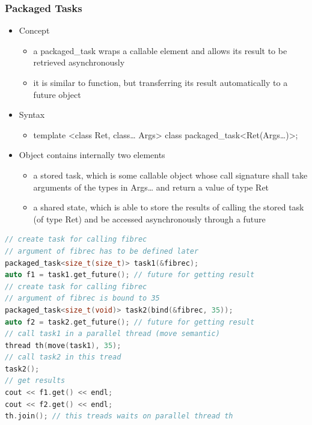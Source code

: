 \hypertarget{packaged-tasks}{%
\subsubsection{Packaged Tasks}\label{packaged-tasks}}

\begin{itemize}
\tightlist
\item
  Concept

  \begin{itemize}
  \tightlist
  \item
    a packaged\_task wraps a callable element and allows its result to
    be retrieved asynchronously
  \item
    it is similar to function, but transferring its result automatically
    to a future object
  \end{itemize}
\item
  Syntax

  \begin{itemize}
  \tightlist
  \item
    template \textless{}class Ret, class\ldots{} Args\textgreater{}
    class packaged\_task\textless{}Ret(Args\ldots{})\textgreater{};
  \end{itemize}
\item
  Object contains internally two elements

  \begin{itemize}
  \tightlist
  \item
    a stored task, which is some callable object whose call signature
    shall take arguments of the types in Args\ldots{} and return a value
    of type Ret
  \item
    a shared state, which is able to store the results of calling the
    stored task (of type Ret) and be accessed asynchronously through a
    future
  \end{itemize}
\end{itemize}

\begin{lstlisting}[language=C++]
// create task for calling fibrec
// argument of fibrec has to be defined later
packaged_task<size_t(size_t)> task1(&fibrec);
auto f1 = task1.get_future(); // future for getting result
// create task for calling fibrec
// argument of fibrec is bound to 35
packaged_task<size_t(void)> task2(bind(&fibrec, 35));
auto f2 = task2.get_future(); // future for getting result
// call task1 in a parallel thread (move semantic)
thread th(move(task1), 35);
// call task2 in this tread
task2();
// get results
cout << f1.get() << endl;
cout << f2.get() << endl;
th.join(); // this treads waits on parallel thread th
\end{lstlisting}

